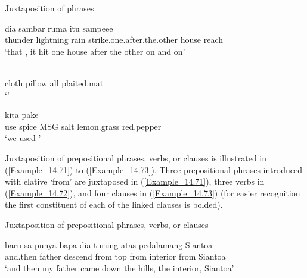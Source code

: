\begin{styleExampleTitle}
Juxtaposition of  phrases
\end{styleExampleTitle}
\ea
\label{Example_14.68}
\gll {}      dia  sambar ruma  itu  sampeee\\  
thunder  lightning  rain      strike.one.after.the.other house    reach\\
\glt ‘that , it hit one house after the other on and on’ \textstyleExampleSource{[081006-022-CvEx.0007]}
\z


\ea
	\label{Example_14.69}
	
	\gll  {}  {\textup\textbar}    {\textup\textbar}    {\textup\textbar}  \\  
	cloth   {} pillow  {}  all  {}  plaited.mat\\
	 ‘’ \textstyleExampleSource{[081025-006-Cv.0057]}
\z
	
\ea%
	\label{Example_14.70}
	
	\gll   kita  pake    {\textup\textbar}      {\textup\textbar}    {\textup\textbar}  \\  
	  use  spice  {}  MSG  salt  {}  lemon.grass {}   red.pepper\\
	\glt ‘we used ’ \textstyleExampleSource{[080919-004-NP.0037]}
\z

\noindent Juxtaposition of prepositional phrases, verbs, or clauses is illustrated in (\ref{Example_14.71}) to (\ref{Example_14.73}). Three prepositional phrases introduced with elative  ‘from’ are juxtaposed in (\ref{Example_14.71}), three verbs in (\ref{Example_14.72}), and four clauses in (\ref{Example_14.73}) (for easier recognition the first constituent of each of the linked clauses is bolded).

\begin{styleExampleTitle}
Juxtaposition of prepositional phrases, verbs, or clauses
\end{styleExampleTitle}
\ea
\label{Example_14.71}
\gll baru  sa  punya  bapa  dia  turung    atas   pedalamang    Siantoa\\  
and.then      father    descend  from  top from  interior  from  Siantoa\\
\glt ‘and then my father came down  the hills,  the interior,  Siantoa’ \textstyleExampleSource{[080927-009-CvNP.0010]}
\z

